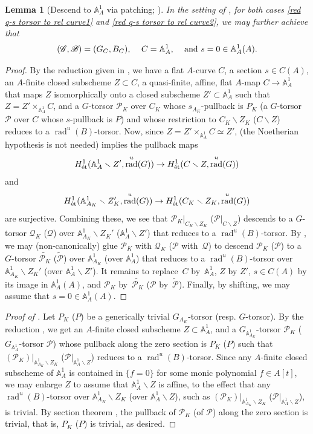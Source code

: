 \documentclass[JEP,XML,SOM,Unicode,published]{cedram}
\let\backslash\smallsetminus
\newcommand{\bA}{\mathbb{A}}
\newcommand{\cP}{\mathcal{P}}
\newcommand{\cQ}{\mathcal{Q}}
\newcommand{\sB}{\mathscr{B}}
\newcommand{\sG}{\mathscr{G}}
\let\wt\widetilde
\let\q\quad
\newcommand{\et}{\textup{ét}}
\DeclareMathOperator{\rad}{rad}
\newcommand{\bpf}{\begin{proof}}
\newcommand{\epf}{\end{proof}}
\newcommand{\blemt}{\begin{lemma-tweak}}
\newcommand{\elemt}{\end{lemma-tweak}}
\theoremstyle{plain}
\newtheorem{lemma-tweak}[subsection]{Lemma}
\theoremstyle{definition}
\begin{document}
\blemt [Descend to $\mathbb{A}_A^1$ via patching; {\cf \cite[Prop.\,7.4]{Ces22a}}]
\label{Desc. to A^1 via patching}
In the setting of , for both cases \eqref{red q-s torsor to rel curve1} and \eqref{red q-s torsor to rel curve2}, we may further achieve that
\[
\text{$(\sG,\sB)=(G_C,B_C)$, \q $C=\mathbb{A}_A^1$, \q and $s=0\in \mathbb{A}_A^1(A)$.}
\]
\elemt
\bpf
By the reduction given in , we have a flat $A$-curve $C$, a section $s\in C(A)$, an $A$-finite closed subscheme $Z\subset C$, a quasi-finite, affine, flat $A$-map $C\to \mathbb{A}_A^1$ that maps $Z$ isomorphically onto a closed subscheme $Z'\subset \mathbb{A}_A^1$ such that $Z= Z' \times_{\mathbb{A}_A^1}C$, and
a $G$-torsor $\cP_K$ over $C_K$ whose $s_{A_K}$-pullback is $P_K$ (\resp a $G$\nobreakdash-tor\-sor~$\cP$ over $C$ whose $s$-pullback is $P$) and whose restriction to $C_K\backslash Z_K$ (\resp $C\backslash Z$) reduces to a $\rad^u(B)$-torsor. Now, since $Z= Z' \times_{\bA_A^1}C\simeq Z'$, \cite[Lem.\,7.2]{Ces22a} (the Noetherian hypothesis is not needed) implies the pullback maps
\[
H^1_{\et}(\bA_A^1\backslash Z',\rad^u(G))\to H^1_{\et}(C\backslash Z,\rad^u(G))
\]
and
\[
H^1_{\et}(\bA_{A_K}^1\backslash Z_K',\rad^u(G))\to H^1_{\et}(C_K\backslash Z_K,\rad^u(G))
\]
are surjective. Combining these, we see that $\cP_K|_{C_K\backslash Z_K}$ (\resp $\cP|_{C\backslash Z}$) descends to a $G$-torsor $\cQ_K$ (\resp $\cQ$) over $\bA_{A_K}^1\backslash Z_K'$ (\resp $\bA_A^1\backslash Z'$) that reduces to a $\rad^u(B)$\nobreakdash-tor\-sor. By \cite[Lem.\,7.1]{Ces22a}, we may (non-canonically) glue $\cP_K$ with $\cQ_K$ (\resp $\cP$ with~$\cQ$) to descend $\cP_K$ (\resp $\cP$) to a $G$-torsor $\wt{\cP_K}$ (\resp $\wt{\cP}$) over $\bA_{A_K}^1$ (\resp over $\bA_{A}^1$) that reduces to a $\rad^u(B)$-torsor over $\bA_{A_K}^1\backslash Z_K'$ (\resp over $\bA_A^1\backslash Z'$).
It remains to replace~$C$ by~$\bA_A^1$, $Z$ by $Z'$, $s\in C(A)$ by its image in $\bA_A^1(A)$, and $\cP_K$ by~$\wt{\cP_K}$ (\resp $\cP$ by~$\wt{\cP}$). Finally, by shifting, we may assume that $s=0\in \bA_A^1(A)$.
\epf

\bpf[Proof of ]
Let $P_K$ (\resp $P$) be a generically trivial $G_{A_K}$-torsor (resp. $G$-torsor). By the reduction , we get an $A$-finite closed subscheme $Z\subset \bA^1_A$, and a $G_{\mathbb{A}_{A_K}^1}$-torsor $\cP_K$ (\resp $G_{\bA_A^1}$-torsor $\cP$) whose pullback along the zero section is $P_K$ (\resp $P$) such that $(\cP_K)|_{\bA_{A_K}^1 \backslash Z_K}$ (\resp $\cP|_{\bA_A^1 \backslash Z}$) reduces to a $\rad^u(B)$-torsor. Since any $A$-finite closed subscheme of $\bA_A^1$ is contained in $\{f=0\}$ for some monic polynomial $f\in A[t]$, we may enlarge $Z$ to assume that $\bA_A^1\backslash Z$ is affine, to the effect that any $\rad^u(B)$-torsor over $\bA_{A_K}^1\backslash Z_K$ (\resp over $\bA_A^1\backslash Z$), such as $(\cP_K)|_{\bA_{A_K}^1 \backslash Z_K}$ (\resp $\cP|_{\bA_A^1 \backslash Z}$), is trivial. By section theorem \cite[Th.\,5.1]{GL23}, the pullback of $\cP_K$ (\resp of $\cP$) along the zero section is trivial, that is, $P_K$ (\resp $P$) is trivial, as desired.
\epf
\end{document}
